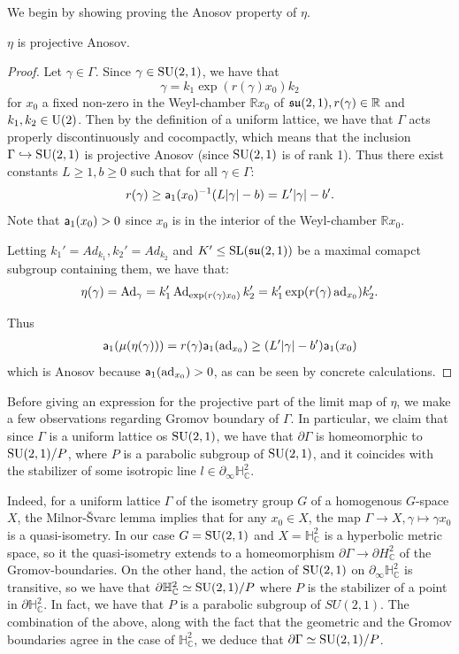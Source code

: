 \documentclass{report}
\begin{document}
We begin by showing proving the Anosov property of $\eta$.
\begin{proposition}\label{prop:counterexample_anosov}
    $\eta$ is projective Anosov.
\end{proposition}
\begin{proof}
Let $\gamma \in \Gamma$.
Since $\gamma \in \operatorname{{\mathrm{SU}}}(2,1)$, we have that
\[
\gamma = k_1 \exp\left( r(\gamma) x_0 \right) k_2
\]
for $x_0$ a fixed non-zero in the Weyl-chamber $\mathbb R x_0$ of $\operatorname{{\mathfrak{su}}}(2,1), r(\gamma) \in \mathbb R$ and $k_1, k_2 \in \operatorname{{\mathrm{U}}}(2)$.
Then by the definition of a uniform lattice, we have that $\Gamma$ acts properly discontinuously and cocompactly, which means that the inclusion $\Gamma \hookrightarrow \operatorname{{\mathrm{SU}}}(2,1)$ is projective Anosov (since $\operatorname{{\mathrm{SU}}}(2,1)$ is of rank 1).
Thus there exist constants $L \geq 1, b \geq 0$ such that for all $\gamma \in \Gamma$:
\[
r(\gamma) \geq {\sf a}_1(x_0)^{-1}(L|\gamma| - b) = L'|\gamma| - b'.
\]
Note that ${\sf a}_1(x_0) > 0 $ since $x_0$ is in the interior of the Weyl-chamber $\mathbb R x_0$.

Letting $k_1' = Ad_{k_1}, k_2' = Ad_{k_2}$ and $K' \leq \operatorname{{\mathrm{SL}}}(\operatorname{{\mathfrak{su}}}(2,1))$ be a maximal comapct subgroup containing them, we have that:
\[
\eta(\gamma) = \operatorname{Ad}_{\gamma} = k_1' \operatorname{Ad}_{\exp(r(\gamma) x_0)} k_2' = k_1' \exp(r(\gamma) \operatorname{ad}_{x_0}) k_2'.
\]

Thus
\begin{align*}
    {\sf a}_1(\mu(\eta(\gamma))) = r(\gamma) {\sf a}_1(\operatorname{ad}_{x_0}) \geq (L'|\gamma| - b'){\sf a}_1(x_0)
\end{align*}
which is Anosov because ${\sf a}_1(\operatorname{ad}_{x_0}) > 0$, as can be seen by concrete calculations.
\end{proof}

Before giving an expression for the projective part of the limit map of $\eta$, we make a few observations regarding Gromov boundary of $\Gamma$.
In particular, we claim that since $\Gamma$ is a uniform lattice os $\operatorname{{\mathrm{SU}}}(2,1)$, we have that $\partial \Gamma$ is homeomorphic to $\operatorname{{\mathrm{SU}}}(2,1)/P$, where $P$ is a parabolic subgroup of $\operatorname{{\mathrm{SU}}}(2,1)$, and it coincides with the stabilizer of some isotropic line $l \in \partial_\infty \mathbb H^2_\mathbb C$.

Indeed, for a uniform lattice $\Gamma$ of the isometry group $G$ of a homogenous $G$-space $X$, the Milnor-Švarc lemma implies that for any $x_0 \in X$, the map $\Gamma \to X, \gamma \mapsto \gamma x_0$ is a quasi-isometry.
In our case $G = \operatorname{{\mathrm{SU}}}(2,1)$ and $X = \mathbb H^2_\mathbb C$ is a hyperbolic metric space, so it the quasi-isometry extends to a homeomorphism $\partial \Gamma \to \partial H^2_\mathbb C$ of the Gromov-boundaries.
On the other hand, the action of $\operatorname{{\mathrm{SU}}}(2,1)$ on $\partial_\infty \mathbb H^2_\mathbb C$ is transitive, so we have that $\partial \mathbb H^2_\mathbb C \simeq \operatorname{{\mathrm{SU}}}(2,1)/P$ where $P$ is the stabilizer of a point in $\partial \mathbb H^2_\mathbb C$.
In fact, we have that $P$ is a parabolic subgroup of $SU(2,1)$.
The combination of the above, along with the fact that the geometric and the Gromov boundaries agree in the case of $\mathbb H^2_\mathbb C$, we deduce that $\partial \Gamma \simeq \operatorname{{\mathrm{SU}}}(2,1)/P$.
\end{document}
